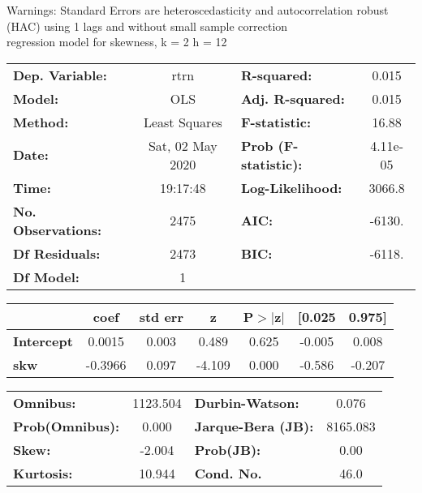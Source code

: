 Warnings: \newline
 [1] Standard Errors are heteroscedasticity and autocorrelation robust (HAC) using 1 lags and without small sample correction\\ 

regression model for skewness, k = 2 h = 12\begin{center}
\begin{tabular}{lclc}
\toprule
\textbf{Dep. Variable:}    &       rtrn       & \textbf{  R-squared:         } &     0.015   \\
\textbf{Model:}            &       OLS        & \textbf{  Adj. R-squared:    } &     0.015   \\
\textbf{Method:}           &  Least Squares   & \textbf{  F-statistic:       } &     16.88   \\
\textbf{Date:}             & Sat, 02 May 2020 & \textbf{  Prob (F-statistic):} &  4.11e-05   \\
\textbf{Time:}             &     19:17:48     & \textbf{  Log-Likelihood:    } &    3066.8   \\
\textbf{No. Observations:} &        2475      & \textbf{  AIC:               } &    -6130.   \\
\textbf{Df Residuals:}     &        2473      & \textbf{  BIC:               } &    -6118.   \\
\textbf{Df Model:}         &           1      & \textbf{                     } &             \\
\bottomrule
\end{tabular}
\begin{tabular}{lcccccc}
                   & \textbf{coef} & \textbf{std err} & \textbf{z} & \textbf{P$> |$z$|$} & \textbf{[0.025} & \textbf{0.975]}  \\
\midrule
\textbf{Intercept} &       0.0015  &        0.003     &     0.489  &         0.625        &       -0.005    &        0.008     \\
\textbf{skw}       &      -0.3966  &        0.097     &    -4.109  &         0.000        &       -0.586    &       -0.207     \\
\bottomrule
\end{tabular}
\begin{tabular}{lclc}
\textbf{Omnibus:}       & 1123.504 & \textbf{  Durbin-Watson:     } &    0.076  \\
\textbf{Prob(Omnibus):} &   0.000  & \textbf{  Jarque-Bera (JB):  } & 8165.083  \\
\textbf{Skew:}          &  -2.004  & \textbf{  Prob(JB):          } &     0.00  \\
\textbf{Kurtosis:}      &  10.944  & \textbf{  Cond. No.          } &     46.0  \\
\bottomrule
\end{tabular}
\end{center}

